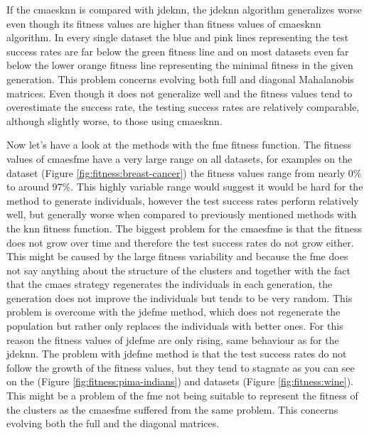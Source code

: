 \documentclass[12pt,a4paper]{report}
\begin{document}
If the \ac{cmaesknn} is compared with \ac{jdeknn}, the \ac{jdeknn} algorithm generalizes worse even though its fitness values are higher than fitness values of \ac{cmaesknn} algorithm. In every single dataset the blue and pink lines representing the test success rates are far below the green fitness line and on most datasets even far below the lower orange fitness line representing the minimal fitness in the given generation. This problem concerns evolving both full and diagonal Mahalanobis matrices. Even though it does not generalize well and the fitness values tend to overestimate the success rate, the testing success rates are relatively comparable, although slightly worse, to those using \ac{cmaesknn}.

Now let's have a look at the methods with the \ac{fme} fitness function. The fitness values of \ac{cmaesfme} have a very large range on all datasets, for examples on the  dataset (Figure \ref{fig:fitness:breast-cancer}) the fitness values range from nearly 0\% to around 97\%. This highly variable range would suggest it would be hard for the method to generate individuals, however the test success rates perform relatively well, but generally worse when compared to previously mentioned methods with the \ac{knn} fitness function. The biggest problem for the \ac{cmaesfme} is that the fitness does not grow over time and therefore the test success rates do not grow either. This might be caused by the large fitness variability and because the \ac{fme} does not say anything about the structure of the clusters and together with the fact that the \ac{cmaes} strategy regenerates the individuals in each generation, the generation does not improve the individuals but tends to be very random. This problem is overcome with the \ac{jdefme} method, which does not regenerate the population but rather only replaces the individuals with better ones. For this reason the fitness values of \ac{jdefme} are only rising, same behaviour as for the \ac{jdeknn}. The problem with \ac{jdefme} method is that the test success rates do not follow the growth of the fitness values, but they tend to stagnate as you can see on the  (Figure \ref{fig:fitness:pima-indians}) and  datasets (Figure \ref{fig:fitness:wine}). This might be a problem of the \ac{fme} not being suitable to represent the fitness of the clusters as the \ac{cmaesfme} suffered from the same problem. This concerns evolving both the full and the diagonal matrices.
\end{document}
